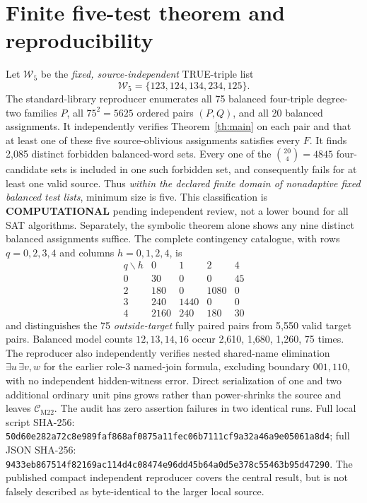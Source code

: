 \documentclass[11pt]{article}
\newcommand{\CM}{\mathcal C_{\mathrm{M22}}}
\begin{document}
\section{Finite five-test theorem and reproducibility}
Let \(\mathcal W_5\) be the \emph{fixed, source-independent} TRUE-triple list
\[
\mathcal W_5=\{123,124,134,234,125\}.
\]
The standard-library reproducer enumerates all 75 balanced four-triple degree-two families \(P\), all \(75^2=5625\) ordered pairs \((P,Q)\), and all 20 balanced assignments. It independently verifies Theorem~\ref{th:main} on each pair and that at least one of these five source-oblivious assignments satisfies every \(F\). It finds 2,085 distinct forbidden balanced-word sets. Every one of the \(\binom{20}{4}=4845\) four-candidate sets is included in one such forbidden set, and consequently fails for at least one valid source. Thus \emph{within the declared finite domain of nonadaptive fixed balanced test lists}, minimum size is five. This classification is \textbf{COMPUTATIONAL} pending independent review, not a lower bound for all SAT algorithms. Separately, the symbolic theorem alone shows any nine distinct balanced assignments suffice.
The complete contingency catalogue, with rows \(q=0,2,3,4\) and columns \(h=0,1,2,4\), is
\[
\begin{array}{c|rrrr}
q\backslash h&0&1&2&4\\\hline
0&30&0&0&45\\
2&180&0&1080&0\\
3&240&1440&0&0\\
4&2160&240&180&30
\end{array}
\]
and distinguishes the 75 \emph{outside-target} fully paired pairs from 5,550 valid target pairs. Balanced model counts \(12,13,14,16\) occur 2,610, 1,680, 1,260, 75 times. The reproducer also independently verifies nested shared-name elimination \(\exists u\,\exists v,w\) for the earlier role-3 named-join formula, excluding boundary \(001,110\), with no independent hidden-witness error. Direct serialization of one and two additional ordinary unit pins grows rather than power-shrinks the source and leaves \(\CM\). The audit has zero assertion failures in two identical runs. Full local script SHA-256: \texttt{50d60e282a72c8e989faf868af0875a11fec06b7111cf9a32a46a9e05061a8d4}; full JSON SHA-256: \texttt{9433eb867514f82169ac114d4c08474e96dd45b64a0d5e378c55463b95d47290}. The published compact independent reproducer covers the central result, but is not falsely described as byte-identical to the larger local source.
\end{document}
